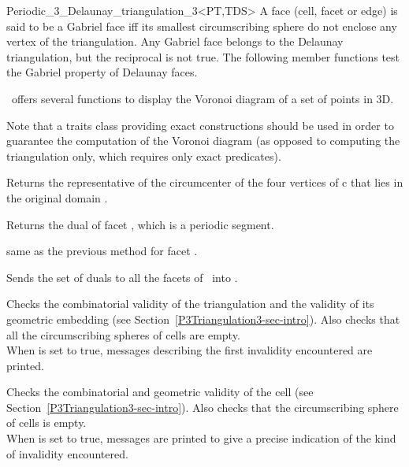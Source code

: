 \begin{ccRefClass}{Periodic_3_Delaunay_triangulation_3<PT,TDS>}
A face (cell, facet or edge) is said to be a Gabriel face iff
its smallest circumscribing sphere do not enclose
any vertex of the triangulation.  Any Gabriel face belongs to the
Delaunay triangulation, but the reciprocal is not true.
The following member functions test the Gabriel property of
Delaunay faces.
\ccGlue 
{}
\ccGlue 
{}
\ccGlue
{} {}


\cgal\ offers several functions to display the Voronoi diagram of 
a set of points in 3D.


Note that a traits class providing exact constructions should be used
in order to guarantee the computation of the Voronoi diagram (as
opposed to computing the triangulation only, which requires only exact
predicates). 


{Returns the representative of the circumcenter of the four vertices
  of c that lies in the original domain .}

{Returns the dual of facet , which is a periodic segment.}

{same as the previous method for facet .
}

{Sends the set of duals to all the facets of \ccVar\ into .}


\begin{ccAdvanced}
{Checks the combinatorial validity of the triangulation and the
validity of its geometric embedding (see
Section~\ref{P3Triangulation3-sec-intro}). Also checks that all the
circumscribing spheres of cells are empty.\\
When  is set to true,  messages describing the first
invalidity encountered are printed.}

{Checks the combinatorial and geometric validity of the cell (see
Section~\ref{P3Triangulation3-sec-intro}). Also checks that the
circumscribing sphere of cells is empty.\\
When  is set to true, messages are printed to give
a precise indication of the kind of invalidity encountered.}


\end{ccAdvanced}
\end{ccRefClass}

